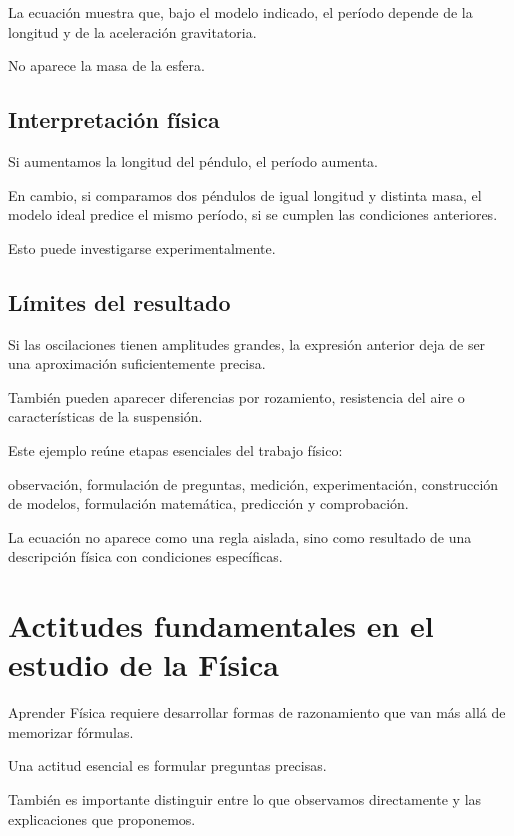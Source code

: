 La ecuación muestra que, bajo el modelo indicado,
el período depende de la longitud
y de la aceleración gravitatoria.

No aparece la masa de la esfera.

\subsection{Interpretación física}

Si aumentamos la longitud del péndulo,
el período aumenta.

En cambio, si comparamos dos péndulos
de igual longitud y distinta masa,
el modelo ideal predice el mismo período,
si se cumplen las condiciones anteriores.

Esto puede investigarse experimentalmente.

\subsection{Límites del resultado}

Si las oscilaciones tienen amplitudes grandes,
la expresión anterior deja de ser una
aproximación suficientemente precisa.

También pueden aparecer diferencias
por rozamiento, resistencia del aire
o características de la suspensión.

\begin{interpretacion}

Este ejemplo reúne etapas esenciales
del trabajo físico:

observación, formulación de preguntas,
medición, experimentación, construcción
de modelos, formulación matemática,
predicción y comprobación.

La ecuación no aparece como una regla aislada,
sino como resultado de una descripción física
con condiciones específicas.

\end{interpretacion}


\section{Actitudes fundamentales en el estudio de la Física}

Aprender Física requiere desarrollar
formas de razonamiento que van
más allá de memorizar fórmulas.

Una actitud esencial es formular
preguntas precisas.

También es importante distinguir
entre lo que observamos directamente
y las explicaciones que proponemos.

